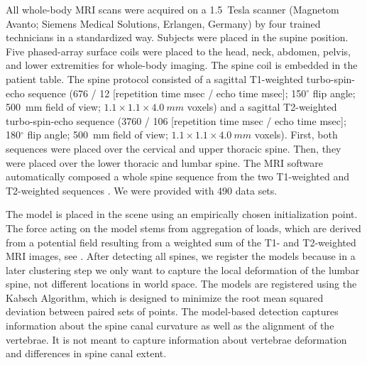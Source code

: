 \documentclass[journal]{style/vgtc} 			          %
\begin{document}
All whole-body MRI scans were acquired on a 1.5~Tesla scanner (Magnetom Avanto; Siemens Medical Solutions, Erlangen, Germany) by four trained technicians in a standardized way. Subjects were placed in the supine position. Five phased-array surface coils were placed to the head, neck, abdomen, pelvis, and lower extremities for whole-body imaging. The spine coil is embedded in the patient table. The spine protocol consisted of a sagittal T1-weighted turbo-spin-echo sequence (676 / 12 [repetition time msec / echo time msec]; 150$^\circ$ flip angle; 500~mm field of view; $1.1\times1.1\times4.0~mm$ voxels) and a sagittal T2-weighted turbo-spin-echo sequence (3760 / 106 [repetition time msec / echo time msec]; 180$^\circ$ flip angle; 500~mm field of view; $1.1\times1.1\times4.0~mm$ voxels). First, both sequences were placed over the cervical and upper thoracic spine. Then, they were placed over the lower thoracic and lumbar spine. The MRI software automatically composed a whole spine sequence from the two T1-weighted and T2-weighted sequences \cite{Hegenscheid2013}. We were provided with 490 data sets.

The model is placed in the scene using an empirically chosen initialization point. The force acting on the model stems from aggregation of loads, which are derived from a potential field resulting from a weighted sum of the T1- and T2-weighted MRI images, see \cite{Rak2013}. After detecting all spines, we register the models because in a later clustering step we only want to capture the local deformation of the lumbar spine, not different locations in world space. The models are registered using the Kabsch Algorithm, which is designed to minimize the root mean squared deviation between paired sets of points.
The model-based detection captures information about the spine canal curvature as well as the alignment of the vertebrae. It is not meant to capture information about vertebrae deformation and differences in spine canal extent.
\end{document}
